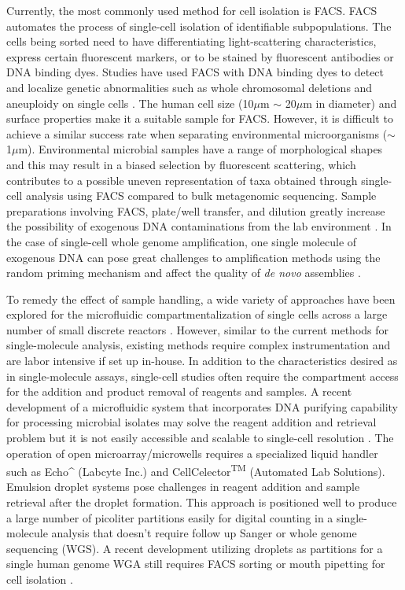Currently, the most commonly used method for cell isolation is FACS. FACS automates the process of single-cell isolation of identifiable subpopulations. The cells being sorted need to have differentiating light-scattering characteristics, express certain fluorescent markers, or to be stained by fluorescent antibodies or DNA binding dyes. Studies have used FACS with DNA binding dyes to detect and localize genetic abnormalities such as whole chromosomal deletions and aneuploidy on single cells \cite{Trask:2002iy}. The human cell size (10$\mu$m $\sim$ 20$\mu$m in diameter) and surface properties make it a suitable sample for FACS. However, it is difficult to achieve a similar success rate when separating environmental microorganisms ($\sim$ 1$\mu$m). Environmental microbial samples have a range of morphological shapes and this may result in a biased selection by fluorescent scattering, which contributes to a possible uneven representation of taxa obtained through single-cell analysis using FACS compared to bulk metagenomic sequencing. Sample preparations involving FACS, plate/well transfer, and dilution greatly increase the possibility of exogenous DNA contaminations from the lab environment \cite{Woyke:2011eg}. In the case of single-cell whole genome amplification, one single molecule of exogenous DNA can pose great challenges to amplification methods using the random priming mechanism and affect the quality of \textit{de novo} assemblies \cite{Blainey:2011dt}.

To remedy the effect of sample handling, a wide variety of approaches have been explored for the microfluidic compartmentalization of single cells across a large number of small discrete reactors \cite{deBourcy:2014ji,Marcy:2007ip}. However, similar to the current methods for single-molecule analysis, existing methods require complex instrumentation and are labor intensive if set up in-house. In addition to the characteristics desired as in single-molecule assays, single-cell studies often require the compartment access for the addition and product removal of reagents and samples. A recent development of a microfluidic system that incorporates DNA purifying capability for processing microbial isolates may solve the reagent addition and retrieval problem but it is not easily accessible and scalable to single-cell resolution \cite{Kim:2017gy}. The operation of open microarray/microwells requires a specialized liquid handler such as Echo^{\textregistered} (Labcyte Inc.) and CellCelector\textsuperscript{TM} (Automated Lab Solutions). Emulsion droplet systems pose challenges in reagent addition and sample retrieval after the droplet formation. This approach is positioned well to produce a large number of picoliter partitions easily for digital counting in a single-molecule analysis that doesn't require follow up Sanger or whole genome sequencing (WGS). A recent development utilizing droplets as partitions for a single human genome WGA still requires FACS sorting or mouth pipetting for cell isolation \cite{Fu:2015gl}. 

